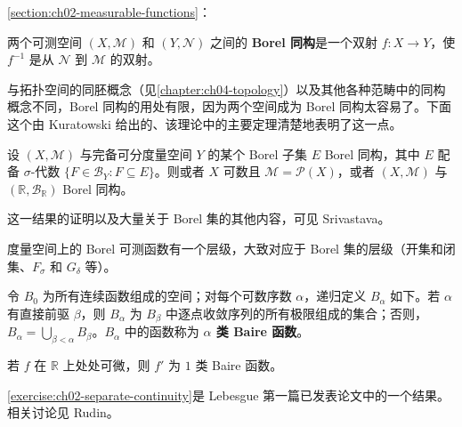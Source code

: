 \documentclass[../../main.tex]{subfiles}%
\begin{document}
\cref{section:ch02-measurable-functions}：
\begin{definition}[Borel 同构]\label{definition:ch02-borel-isomorphism}
两个可测空间 $(X,\mathscr{M})$ 和 $(Y,\mathscr{N})$ 之间的 \textbf{Borel 同构}是一个双射 $f:X\to Y$，使 $f^{-1}$ 是从 $\mathscr{N}$ 到 $\mathscr{M}$ 的双射。
\end{definition}
与拓扑空间的同胚概念（见\cref{chapter:ch04-topology}）以及其他各种范畴中的同构概念不同，Borel 同构的用处有限，因为两个空间成为 Borel 同构太容易了。下面这个由 Kuratowski 给出的、该理论中的主要定理清楚地表明了这一点。
\begin{theorem}[Kuratowski]\label{theorem:ch02-kuratowski-borel-isomorphism}
设 $(X,\mathscr{M})$ 与完备可分度量空间 $Y$ 的某个 Borel 子集 $E$ Borel 同构，其中 $E$ 配备 $\sigma$-代数 $\{F\in\mathscr{B}_Y:F\subseteq E\}$。则或者 $X$ 可数且 $\mathscr{M}=\mathscr{P}(X)$，或者 $(X,\mathscr{M})$ 与 $(\mathbb{R},\mathscr{B}_{\mathbb{R}})$ Borel 同构。
\end{theorem}
这一结果的证明以及大量关于 Borel 集的其他内容，可见 Srivastava\cite{folland-bib-139}。

度量空间上的 Borel 可测函数有一个层级，大致对应于 Borel 集的层级（开集和闭集、$F_\sigma$ 和 $G_\delta$ 等）。
\begin{definition}[Baire 类]\label{definition:ch02-baire-class}
令 $B_0$ 为所有连续函数组成的空间；对每个可数序数 $\alpha$，递归定义 $B_\alpha$ 如下。若 $\alpha$ 有直接前驱 $\beta$，则 $B_\alpha$ 为 $B_\beta$ 中逐点收敛序列的所有极限组成的集合；否则，$B_\alpha=\bigcup_{\beta<\alpha}B_\beta$。$B_\alpha$ 中的函数称为 \textbf{$\alpha$ 类 Baire 函数}。
\end{definition}
\begin{example}\label{example:ch02-baire-derivative}
若 $f$ 在 $\mathbb{R}$ 上处处可微，则 $f'$ 为 $1$ 类 Baire 函数。
\end{example}
\cref{exercise:ch02-separate-continuity}是 Lebesgue 第一篇已发表论文中的一个结果。相关讨论见 Rudin\cite{folland-bib-123}。
\end{document}
